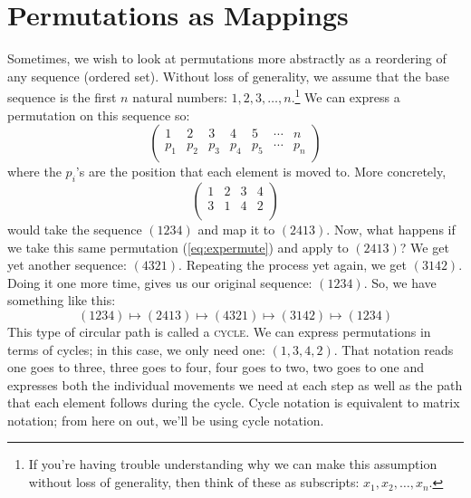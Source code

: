 \documentclass[a4paper,12pt,oneside,leqno]{scrartcl}%
\newcommand{\enquote}[1]{\frqq{}#1\flqq{}}
\newcommand{\terminus}[1]{\textsc{#1}}
\begin{document}
\section{Permutations as Mappings}
Sometimes, we wish to look at permutations more abstractly as a reordering of any sequence (ordered set). Without loss of generality, we assume that the base sequence is the first $n$ natural numbers: $1,2,3,\ldots,n$.\footnote{If you're having trouble understanding why we can make this assumption without loss of generality, then think of these as subscripts: $x_{1},x_{2},\ldots,x_{n}$.} We can express a permutation on this sequence so:
\begin{equation}
\left(
\begin{array}{*{7}{c}}
1 & 2 & 3 & 4 & 5 & \cdots &n\\
p_{1} & p_{2} & p_{3} & p_{4} & p_{5} & \cdots & p_{n}\\
\end{array}
\right)
\end{equation}
where the $p_{i}$'s are the position that each element is moved to.  More concretely, 
\begin{equation}
\left(
\begin{array}{*{4}{c}}
1 & 2 & 3 & 4 \\
3 & 1 & 4 & 2\\
\end{array}
\right)\label{eq:expermute}
\end{equation}
would take the sequence $(1 2 3 4)$ and map it to $(2 4 1 3)$.  Now, what happens if we take this same permutation (\ref{eq:expermute}) and apply to $(2 4 1 3)$?  We get yet another sequence: $(4 3 2 1)$.  Repeating the process yet again, we get  $(3 1 4 2)$.  Doing it one more time, gives us our original sequence: $(1 2 3 4)$. So, we have something like this:
\begin{equation}\label{eq:cycle}
(1 2 3 4) \mapsto (2 4 1 3) \mapsto (4 3 2 1) \mapsto (3 1 4 2) \mapsto (1 2 3 4)
\end{equation}
This type of circular path is called a \terminus{cycle}.  We can express permutations in terms of cycles; in this case, we only need one: $(1,3,4,2)$.  That notation reads \enquote{one goes to three, three goes to four, four goes to two, two goes to one} and expresses both the individual movements we need at each step as well as the path that each element follows during the cycle.
Cycle notation is equivalent to matrix notation; from here on out, we'll be using cycle notation.
\end{document}

